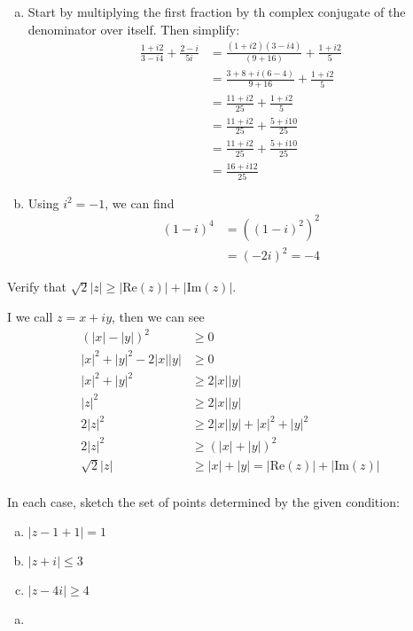 \documentclass{article}
\begin{document}
\begin{solution}
\begin{enumerate}[(a)]
\item Start by multiplying the first fraction by th complex conjugate of the denominator over itself. Then simplify:
\begin{align*}
\frac{1+i2}{3-i4} + \frac{2-i}{5i} &= \frac{(1+i2)(3-i4)}{(9+16)} + \frac{1+i2}{5} \\
&= \frac{3+8+i(6-4)}{9+16} + \frac{1+i2}{5} \\
&= \frac{11+i2}{25} + \frac{1+i2}{5} \\
&= \frac{11+i2}{25} + \frac{5+i10}{25} \\
&= \frac{11+i2}{25} + \frac{5+i10}{25} \\
&= \boxed{\frac{16+i12}{25}}
\end{align*}
\item
Using $i^{2}=-1$, we can find
\begin{align*}
(1-i)^{4} &= \left( (1-i)^{2} \right)^{2} \\
&= \left( -2i \right)^{2} = \boxed{-4}
\end{align*}
\end{enumerate}
\end{solution}

\begin{problem}
Verify that $\sqrt{2}|z| \ge |\text{Re}(z)| + |\text{Im}(z)|$.
\end{problem}

\begin{solution}
I we call $z=x+iy$, then we can see
\begin{align*}
(|x|-|y|)^{2} &\ge 0 \\
|x|^{2} +|y|^{2} -2|x||y| &\ge 0 \\
|x|^{2} +|y|^{2} &\ge 2|x||y| \\
|z|^{2} &\ge 2|x||y| \\
2|z|^{2} &\ge 2|x||y| + |x|^{2} +|y|^{2} \\
2|z|^{2} &\ge \left(|x| +|y|\right)^{2} \\
\sqrt{2}|z| &\ge |x| +|y| = |\text{Re}(z)| + |\text{Im}(z)| \\
\end{align*}
\end{solution}

\begin{problem}
In each case, sketch the set of points determined by the given condition:
\begin{enumerate}[(a)]
\item $|z-1+1|=1$
\item $|z+i|\le 3$
\item $|z-4i|\ge 4$
\end{enumerate}
\end{problem}

\begin{solution}
\begin{enumerate}[(a)]
\item
\end{enumerate}
\end{solution}
\end{document}

